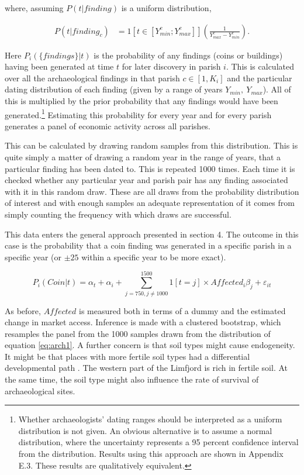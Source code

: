 \documentclass[11pt]{article}
\begin{document}
where, assuming $P(t|finding)$ is a uniform distribution,

\begin{equation}
\begin{split}
\label{eq:arch12}
P(t|finding_c)& = 1[t\in [Y_{min}^c;Y_{max}^c]] \left(\frac{1}{Y_{max}^c - Y_{min}^c}\right).
\end{split}
\end{equation}

Here $P_i(\{findings\}|t)$ is the probability of any findings (coins or buildings) having been generated at time $t$ for later discovery in parish $i$. This is calculated over all the archaeological findings in that parish $c \in [1, K_i]$ and the particular dating distribution of each finding (given by a range of years $Y_{min},\: Y_{max}$). All of this is multiplied by the prior probability that any findings would have been generated.\footnote{Whether archaeologists' dating ranges should be interpreted as a uniform distribution is not given. An obvious alternative is to assume a normal distribution, where the uncertainty represents a 95 percent confidence interval from the distribution. Results using this approach are shown in Appendix E.3. These results are qualitatively equivalent.} Estimating this probability for every year and for every parish generates a panel of economic activity across all parishes. 

This can be calculated by drawing random samples from this distribution. This is quite simply a matter of drawing a random year in the range of years, that a particular finding has been dated to. This is repeated 1000 times. Each time it is checked whether any particular year and parish pair has any finding associated with it in this random draw. These are all draws from the probability distribution of interest and with enough samples an adequate representation of it comes from simply counting the frequency with which draws are successful. 

This data enters the general approach presented in section 4. The outcome in this case is the probability that a coin finding was generated in a specific parish in a specific year (or $\pm 25$ within a specific year to be more exact).

\begin{equation}
\label{eq:eq7_4}
P_i(Coin|t) = \alpha_t + \alpha_i + \sum_{j = 750, j\neq 1000}^{1500} 1[t=j]\times Affected_{i}\beta_{j}  + \varepsilon_{it}
\end{equation}

As before, $Affected$ is measured both in terms of a dummy and the estimated change in market access. Inference is made with a clustered bootstrap, which resamples the panel from the 1000 samples drawn from the distribution of equation \ref{eq:arch1}. A further concern is that soil types might cause endogeneity. It might be that places with more fertile soil types had a differential developmental path \citep{HeavyPlough2016, WinnersAndLosers2022}. The western part of the Limfjord is rich in fertile soil. At the same time, the soil type might also influence the rate of survival of archaeological sites. 
\end{document}
